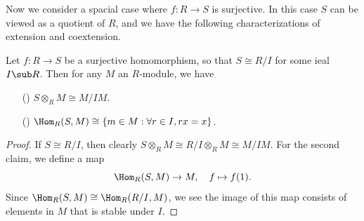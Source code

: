 Now we consider a spacial case where $f:R\to S$ is surjective. In this case $S$ can be viewed as a quotient of $R$, and we have the following characterizations of extension and 
coextension.
\begin{proposition}\label{module extension by surjective map}
Let $f:R\to S$ be a surjective homomorphism, so that $S\cong R/I$ for some ieal $I\sub R$. Then for any $M$ an $R$-module, we have
\begin{itemize}
\item[(\rmnum{1})] $S\otimes_RM\cong M/IM$.
\item[(\rmnum{2})] $\Hom_R(S,M)\cong\{m\in M:\forall r\in I,rx=x\}$.
\end{itemize}
\end{proposition}
\begin{proof}
If $S\cong R/I$, then clearly $S\otimes_RM\cong R/I\otimes_RM\cong M/IM$. For the second claim, we define a map
\[\Hom_R(S,M)\to M,\quad f\mapsto f(1).\]
Since $\Hom_R(S,M)\cong\Hom_R(R/I,M)$, we see the image of this map consists of elements in $M$ that is stable under $I$.
\end{proof}
